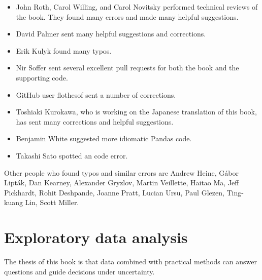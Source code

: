 \documentclass[12pt]{book}
\begin{document}
\begin{itemize}
\item John Roth, Carol Willing, and Carol Novitsky performed technical
reviews of the book.  They found many errors and made many
helpful suggestions.

\item David Palmer sent many helpful suggestions and corrections.

\item Erik Kulyk found many typos.

\item Nir Soffer sent several excellent pull requests for both the
  book and the supporting code.

\item GitHub user flothesof sent a number of corrections.

\item Toshiaki Kurokawa, who is working on the Japanese translation of
this book, has sent many corrections and helpful suggestions.

\item Benjamin White suggested more idiomatic Pandas code.

\item Takashi Sato spotted an code error.


\end{itemize}

Other people who found typos and similar errors are Andrew Heine,
G\'{a}bor Lipt\'{a}k,
Dan Kearney,
Alexander Gryzlov, 
Martin Veillette, 
Haitao Ma, 
Jeff Pickhardt,
Rohit Deshpande,
Joanne Pratt,
Lucian Ursu,
Paul Glezen,
Ting-kuang Lin,
Scott Miller.



\normalsize

\clearemptydoublepage

\begin{latexonly}

\tableofcontents

\clearemptydoublepage

\end{latexonly}

\mainmatter


\chapter{Exploratory data analysis}
\label{intro}

The thesis of this book is that data combined with practical
methods can answer questions and guide decisions under uncertainty.
\end{document}
